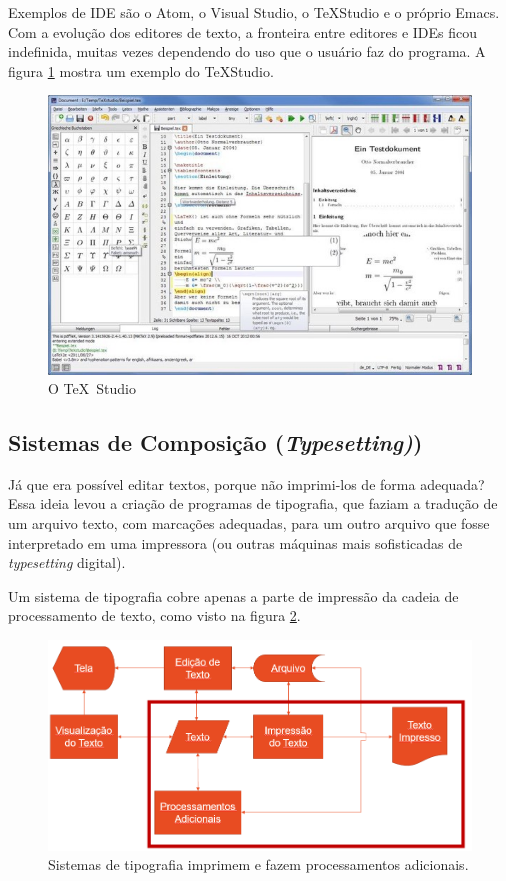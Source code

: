 Exemplos de IDE são o Atom, o Visual Studio, o \TeX Studio e o próprio Emacs. Com a evolução dos editores de texto, a fronteira entre editores e IDEs ficou  indefinida, muitas vezes dependendo do uso que o usuário faz do programa. A figura \ref{fig:texstudio} mostra um exemplo do \TeX Studio.




\begin{figure}[hbt]
    \centering
    \includegraphics[width=0.7\linewidth]{Images/Picture1}
    \caption{O \TeX\ Studio}
    \label{fig:texstudio}
\end{figure}

\subsection{Sistemas de Composição (\textit{Typesetting)})}

Já que era possível editar textos, porque não imprimi-los de forma adequada? Essa ideia levou a criação de programas de tipografia, que faziam a tradução de um arquivo texto, com marcações adequadas, para um outro arquivo que fosse interpretado em uma impressora (ou outras máquinas mais sofisticadas de \textit{typesetting} digital). 

Um sistema de tipografia cobre apenas a parte de impressão da cadeia de processamento de texto, como visto na figura \ref{fig:sisttipo1}.

\begin{figure}[hbt]
    \centering
    \includegraphics[width=0.7\linewidth]{Images/latex1}
    \caption[Sistemas de tipografia]{Sistemas de tipografia imprimem e fazem processamentos adicionais.}
    \label{fig:sisttipo1}
\end{figure}


